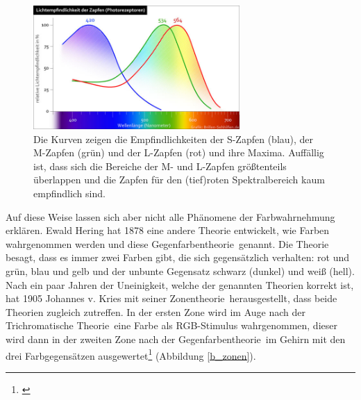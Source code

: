 \begin{figure}[H]     %
\centering
\includegraphics[width=0.7\textwidth]{bilder/sml} 
\caption {Die Kurven zeigen die Empfindlichkeiten der S-Zapfen (blau), der M-Zapfen (grün) und der L-Zapfen (rot) und ihre Maxima. Auffällig ist, dass sich die Bereiche der M- und L-Zapfen größtenteils überlappen und die Zapfen für den (tief)roten Spektralbereich kaum empfindlich sind\protect\footnotemark .}\label{b_sml}
\end{figure}


\noindent Auf diese Weise lassen sich aber nicht alle Phänomene der Farbwahrnehmung erklären. Ewald Hering hat 1878 eine andere Theorie entwickelt, wie Farben wahrgenommen werden und diese \glqq Gegenfarbentheorie\grqq\ genannt. Die Theorie besagt, dass es immer zwei Farben gibt, die sich gegensätzlich verhalten: rot und grün, blau und gelb und der unbunte Gegensatz schwarz (dunkel) und weiß (hell).\\ Nach ein paar Jahren der Uneinigkeit, welche der genannten Theorien korrekt ist, hat 1905 Johannes v. Kries mit seiner \glqq Zonentheorie\grqq\ herausgestellt, dass beide Theorien zugleich zutreffen. In der ersten Zone wird im Auge nach der \glqq Trichromatische Theorie\grqq\ eine Farbe als RGB-Stimulus wahrgenommen, dieser wird dann in der zweiten Zone nach der \glqq Gegenfarbentheorie\grqq\ im Gehirn mit den drei Farbgegensätzen ausgewertet\footnote{\cite[104]{hentschel}} (Abbildung \ref{b_zonen}).
 
